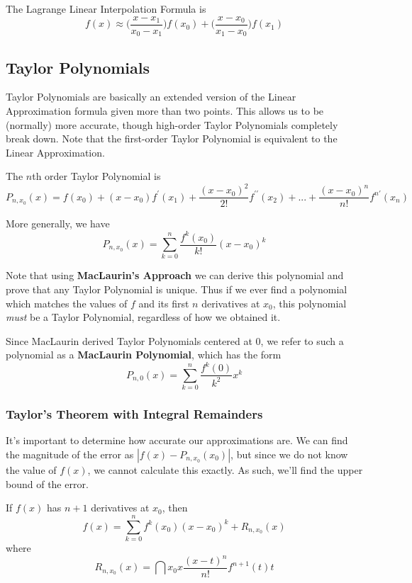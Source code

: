 \documentclass[12pt]{article}
\begin{document}
The Lagrange Linear Interpolation Formula is \[ f(x) \approx \bigg(\frac{x - x_1}{x_0 - x_1}\bigg)f(x_0) + \bigg(\frac{x - x_0}{x_1 - x_0}\bigg)f(x_1) \]

\subsection*{Taylor Polynomials}
Taylor Polynomials are basically an extended version of the Linear Approximation formula given more than two points. This allows us to be (normally) more accurate, though high-order Taylor Polynomials completely break down. Note that the first-order Taylor Polynomial is equivalent to the Linear Approximation.

The $n$th order Taylor Polynomial is \[ P_{n,x_0}(x) = f(x_0) + (x - x_0)f^\prime(x_1) + \frac{(x - x_0)^2}{2!} f^{\prime\prime}(x_2) + ... + \frac{(x - x_0)^n}{n!}f^{n\prime}(x_n) \]

More generally, we have \[ P_{n,x_0}(x) = \sum_{k=0}^n \frac{f^k(x_0)}{k!}(x - x_0)^k \]

Note that using {\bf MacLaurin's Approach} we can derive this polynomial and prove that any Taylor Polynomial is unique. Thus if we ever find a polynomial which matches the values of $f$ and its first $n$ derivatives at $x_0$, this polynomial \emph{must} be a Taylor Polynomial, regardless of how we obtained it.

Since MacLaurin derived Taylor Polynomials centered at 0, we refer to such a polynomial as a {\bf MacLaurin Polynomial}, which has the form \[ P_{n,0}(x) = \sum_{k=0}^n \frac{f^k(0)}{k^2} x^k \]

\subsubsection*{Taylor's Theorem with Integral Remainders}
It's important to determine how accurate our approximations are. We can find the magnitude of the error as $|f(x) - P_{n,x_0}(x_0)|$, but since we do not know the value of $f(x)$, we cannot calculate this exactly. As such, we'll find the upper bound of the error.

If $f(x)$ has $n + 1$ derivatives at $x_0$, then \[ f(x) = \sum_{k=0}^n f^k(x_0)(x - x_0)^k + R_{n,x_0}(x) \] where \[ R_{n,x_0}(x) = \dint{x_0}{x}{\frac{(x-t)^n}{n!}f^{n+1}(t)}{t} \]
\end{document}
